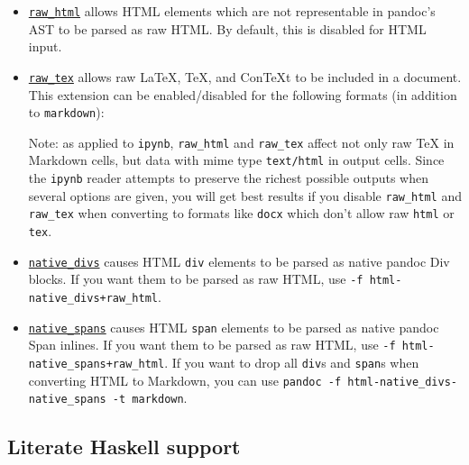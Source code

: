 \documentclass[
]{article}
\providecommand{\tightlist}{%
  \setlength{\itemsep}{0pt}\setlength{\parskip}{0pt}}
\begin{document}
\begin{itemize}
\item
  \protect\hyperlink{extension-raw_html}{\texttt{raw\_html}} allows HTML
  elements which are not representable in pandoc's AST to be parsed as
  raw HTML. By default, this is disabled for HTML input.
\item
  \protect\hyperlink{extension-raw_tex}{\texttt{raw\_tex}} allows raw
  LaTeX, TeX, and ConTeXt to be included in a document. This extension
  can be enabled/disabled for the following formats (in addition to
  \texttt{markdown}):


  Note: as applied to \texttt{ipynb}, \texttt{raw\_html} and
  \texttt{raw\_tex} affect not only raw TeX in Markdown cells, but data
  with mime type \texttt{text/html} in output cells. Since the
  \texttt{ipynb} reader attempts to preserve the richest possible
  outputs when several options are given, you will get best results if
  you disable \texttt{raw\_html} and \texttt{raw\_tex} when converting
  to formats like \texttt{docx} which don't allow raw \texttt{html} or
  \texttt{tex}.
\item
  \protect\hyperlink{extension-native_divs}{\texttt{native\_divs}}
  causes HTML \texttt{div} elements to be parsed as native pandoc Div
  blocks. If you want them to be parsed as raw HTML, use
  \texttt{-f\ html-native\_divs+raw\_html}.
\item
  \protect\hyperlink{extension-native_spans}{\texttt{native\_spans}}
  causes HTML \texttt{span} elements to be parsed as native pandoc Span
  inlines. If you want them to be parsed as raw HTML, use
  \texttt{-f\ html-native\_spans+raw\_html}. If you want to drop all
  \texttt{div}s and \texttt{span}s when converting HTML to Markdown, you
  can use
  \texttt{pandoc\ -f\ html-native\_divs-native\_spans\ -t\ markdown}.
\end{itemize}

\hypertarget{literate-haskell-support}{%
\subsection{Literate Haskell support}\label{literate-haskell-support}}
\end{document}

